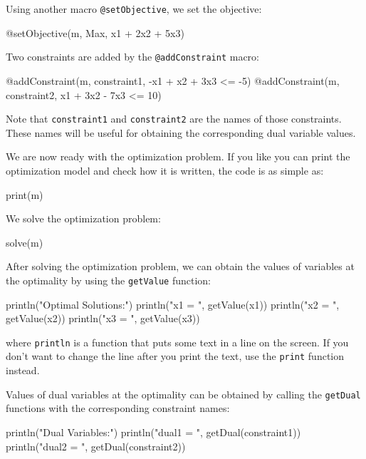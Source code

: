 Using another macro \texttt{@setObjective}, we set the objective:
\begin{code}
@setObjective(m, Max, x1 + 2x2 + 5x3)
\end{code}

Two constraints are added by the \texttt{@addConstraint} macro:
\begin{code}
@addConstraint(m, constraint1, -x1 +  x2 + 3x3 <= -5)
@addConstraint(m, constraint2,  x1 + 3x2 - 7x3 <= 10)
\end{code}
\noindent Note that \texttt{constraint1} and \texttt{constraint2} are the names of those constraints. These names will be useful for obtaining the corresponding dual variable values.

We are now ready with the optimization problem. If you like you can print the optimization model and check how it is written, the code is as simple as:
\begin{code}
print(m)
\end{code}
\noindent We solve the optimization problem:
\begin{code}
solve(m)
\end{code}

After solving the optimization problem, we can obtain the values of variables at the optimality by using the \texttt{getValue} function:
\begin{code}
println("Optimal Solutions:")
println("x1 = ", getValue(x1))
println("x2 = ", getValue(x2))
println("x3 = ", getValue(x3))
\end{code}
\noindent where \texttt{println} is a function that puts some text in a line on the screen. If you don't want to change the line after you print the text, use the \texttt{print} function instead.

Values of dual variables at the optimality can be obtained by calling the \texttt{getDual} functions with the corresponding constraint names:
\begin{code}
println("Dual Variables:")
println("dual1 = ", getDual(constraint1))
println("dual2 = ", getDual(constraint2))
\end{code}


